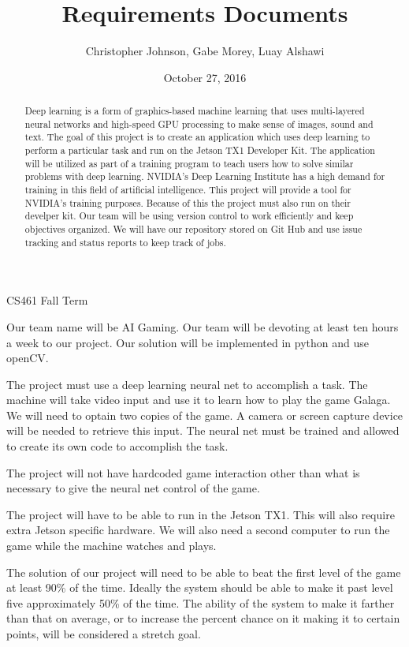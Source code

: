 \documentclass[letterpaper,10pt]{article}
\author{Christopher Johnson, Gabe Morey, Luay Alshawi}
\title{Requirements Documents}
\date{October 27, 2016}
\begin{document}
\begin{titlingpage}
\maketitle
CS461 Fall Term

\begin{abstract}
Deep learning is a form of graphics-based machine learning that uses multi-layered neural networks and high-speed 
GPU processing to make sense of images, sound and text. 
The goal of this project is to create an application which uses deep learning to perform a particular task and run on the Jetson TX1 Developer Kit.
The application will be utilized as part of a training program to teach users how to solve similar problems with deep learning. NVIDIA's Deep Learning Institute has a high demand for training in this field of artificial intelligence. 
This project will provide a tool for NVIDIA's training purposes. 
Because of this the project must also run on their develper kit.
Our team will be using version control to work efficiently and keep objectives organized. 
We will have our repository stored on Git Hub and use issue tracking and status reports to keep track of jobs.
\end{abstract}

\end{titlingpage}
Our team name will be AI Gaming.
Our team will be devoting at least ten hours a week to our project.
Our solution will be implemented in python and use openCV.

The project must use a deep learning neural net to accomplish a task.
The machine will take video input and use it to learn how to play the game Galaga. 
We will need to optain two copies of the game.
A camera or screen capture device will be needed to retrieve this input. 
The neural net must be trained and allowed to create its own code to accomplish the task.

The project will not have hardcoded game interaction other than what is necessary to give the neural net control of the game.

The project will have to be able to run in the Jetson TX1. 
This will also require extra Jetson specific hardware.
We will also need a second computer to run the game while the machine watches and plays.

The solution of our project will need to be able to beat the first level of the game at least 90\% of the time. 
Ideally the system should be able to make it past level five approximately 50\% of the time.
The ability of the system to make it farther than that on average, or to increase the percent chance on it making it to certain points, will be considered a stretch goal.
\end{document}
